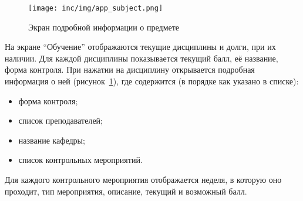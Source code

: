 \begin{figure}[ht]
  \centering
  \texttt{[image: inc/img/app\_subject.png]}
  \caption{Экран подробной информации о предмете}
  \label{fig:appSubject}
\end{figure}

На экране ``Обучение'' отображаются текущие дисциплины и долги, при их наличии.
Для каждой дисциплины показывается текущий балл, её название, форма контроля.
При нажатии на дисциплину открывается подробная информация о ней (рисунок~\ref{fig:appSubject}), где содержится (в порядке как указано в списке):
\begin{itemize}
  \item форма контроля;
  \item список преподавателей;
  \item название кафедры;
  \item список контрольных мероприятий.
\end{itemize}

Для каждого контрольного мероприятия отображается неделя, в которую оно проходит, тип мероприятия, описание, текущий и возможный балл.

\conclusions
\label{sec:designConclusions}
